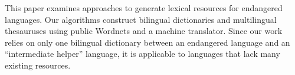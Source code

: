 This paper examines approaches to generate lexical resources for endangered languages. Our algorithms construct bilingual dictionaries and multilingual thesauruses using public Wordnets and a machine translator. Since our work relies on only one bilingual dictionary between an endangered language and an ``intermediate helper'' language, it is applicable to languages that lack many existing resources.

